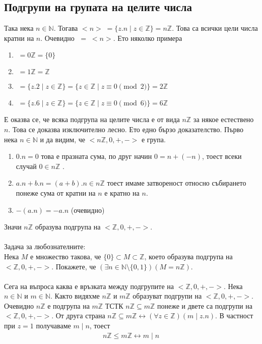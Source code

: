 \documentclass[12pt]{article}
\begin{document}
\subsection{Подгрупи на групата на целите числа}
Така нека \(n \in \mathbb{N}\). Тогава \(<n> \; = \{z.n \; | \; z \in \mathbb{Z}\} = n\mathbb{Z}\). Това са всички цели числа кратни на \(n\).
Очевидно \(<-n> \; = \; <n>\).
Ето няколко примера
\begin{enumerate}
    \item \(<0> \; = 0\mathbb{Z} = \{0\}\)
    \item \(<1> \; = 1\mathbb{Z} = \mathbb{Z}\)
    \item \(<2> \; = \{z.2 \; | \; z \in \mathbb{Z}\} = \{z \in \mathbb{Z} \; | \; z \equiv 0 \pmod{2}\} = 2\mathbb{Z}\)
    \item \(<6> \; = \{z.6 \; | \; z \in \mathbb{Z}\} = \{z \in \mathbb{Z} \; | \; z \equiv 0 \pmod{6}\} = 6\mathbb{Z}\)
\end{enumerate}
Е оказва се, че всяка подгрупа на целите числа е от вида \(n\mathbb{Z}\) за някое естествено \(n\). Това се доказва изключително лесно. Ето едно бързо доказателство.
Първо нека \(n \in \mathbb{N}\) и да видим, че \(<n\mathbb{Z}, 0, +, ->\) е група.
\begin{enumerate}
    \item \(0.n = 0\) това е празната сума, по друг начин \(0 = n + (-n)\), тоест всеки случай \(0 \in n\mathbb{Z}\) .
    \item \(a.n + b.n = (a + b).n \in n\mathbb{Z}\) тоест имаме затвореност относно събирането понеже сума от кратни на \(n\) е кратно на \(n\).
    \item \(-(a.n) = -a.n\) (очевидно)
\end{enumerate}
Значи \(n\mathbb{Z}\) образува подгрупа на \(<\mathbb{Z}, 0, +, ->\).
\\
\vspace{2mm}
\\
Задача за любознателните:  \\
Нека \(M\) е множество такова, че \(\{0\} \subset M \subset \mathbb{Z}\),
което образува подгрупа на \(<\mathbb{Z}, 0, +, ->\). Покажете, че
\((\exists n \in \mathbb{N} \setminus \{0, 1\})(M = n\mathbb{Z})\).
\\
\vspace{2mm}
\\
Сега на въпроса каква е връзката между подгрупите на \(<\mathbb{Z}, 0, +, ->\).
Нека \(n \in \mathbb{N}\) и \(m \in \mathbb{N}\). Както видяхме \(n\mathbb{Z}\) и \(m\mathbb{Z}\) образуват подгрупи на \(<\mathbb{Z}, 0, +, ->\).
Очевидно \(n\mathbb{Z}\) е подгрупа на \(m\mathbb{Z}\) ТСТК \(n\mathbb{Z} \subseteq m\mathbb{Z}\) понеже и двете са подгрупи на \(<\mathbb{Z}, 0, +, ->\).
От друга страна \(n\mathbb{Z} \subseteq m\mathbb{Z} \longleftrightarrow (\forall z \in \mathbb{Z})(m \mid z.n)\). В частност при \(z = 1\) получаваме \(m \mid n\), тоест
\begin{align*}
    n\mathbb{Z} \leq m\mathbb{Z} \longleftrightarrow m \mid n
\end{align*}
\end{document}
